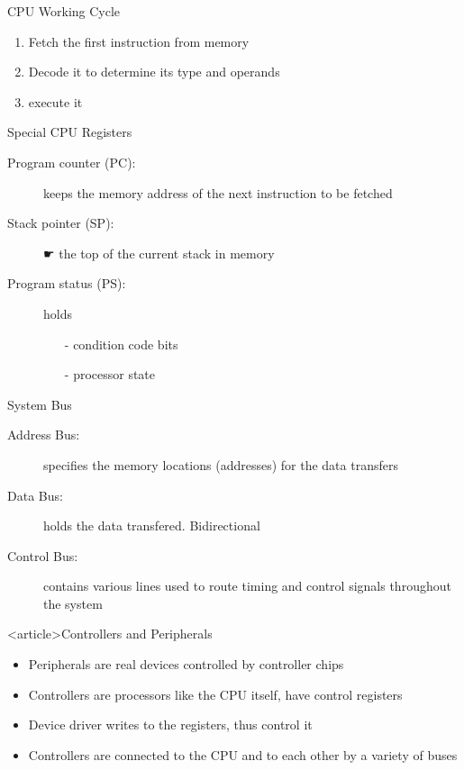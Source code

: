 \begin{frame}{CPU Working Cycle}
  \begin{center}
  \end{center}
  \begin{enumerate}
  \item Fetch the first instruction from memory
  \item Decode it to determine its type and operands
  \item execute it
  \end{enumerate}
  \begin{block}{Special CPU Registers}
    \begin{description}
    \item[Program counter (PC):] keeps the memory address of the next instruction to
      be fetched
    \item[Stack pointer (SP):] {\symbola ☛} the top of the current stack in memory
    \item[Program status (PS):] holds
      \begin{itemize}
      \item[-] condition code bits
      \item[-] processor state
      \end{itemize}
    \end{description}
  \end{block}
\end{frame}

\begin{frame}{System Bus}
  \begin{center}
  \end{center}
  \begin{description}
  \item[Address Bus:] specifies the memory locations (addresses) for the
    data transfers
  \item[Data Bus:] holds the data transfered. Bidirectional
  \item[Control Bus:] contains various lines used to route timing and
    control signals throughout the system
  \end{description}
\end{frame}

\begin{frame}<article>{Controllers and Peripherals}
  \begin{itemize}
  \item Peripherals are real devices controlled by controller chips
  \item Controllers are processors like the CPU itself, have control registers
  \item Device driver writes to the registers, thus control it
  \item Controllers are connected to the CPU and to each other by a variety of buses
  \end{itemize}
\end{frame}

